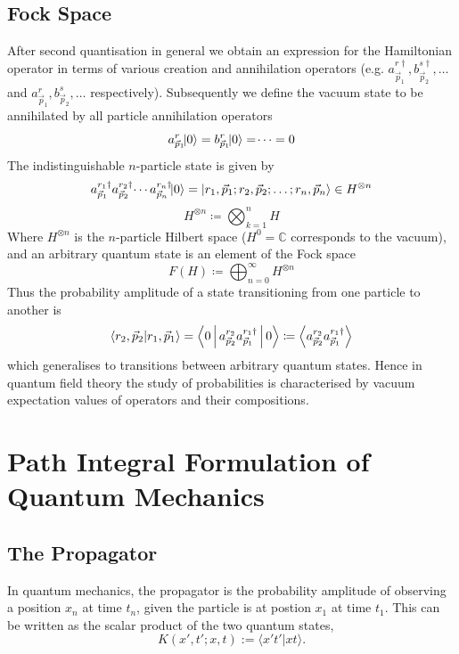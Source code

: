 \documentclass[11pt, a4paper]{article}
\theoremstyle{definition}
\theoremstyle{plain}
\begin{document}
\subsection{Fock Space}
After second quantisation in general we obtain an expression for the Hamiltonian operator
in terms of various creation and annihilation operators (e.g. $a^{r\dagger}_{\vec{p}_1},
b^{s\dagger}_{\vec{p}_2}, \dots$ and $a^{r}_{\vec{p}_1}, b^{s}_{\vec{p}_2}, \dots$ 
respectively). Subsequently we define the vacuum state to be annihilated by
all particle annihilation operators
\begin{equation}
  {a^{r}_{\vec{p}_1}}\!\!\ket{0} = b^{r}_{\vec{p}_1}\!\!\ket{0} = \dotsi = 0
\end{equation}
The indistinguishable $n$-particle state is given by 
\begin{equation}
  a^{r_1\dagger}_{\vec{p}_1}a^{r_2\dagger}_{\vec{p}_2}\dotsi
  a^{r_n\dagger}_{\vec{p}_n}\!\!\ket{0} =
  \ket{r_1, \vec{p}_1; r_2, \vec{p}_2; \dots; r_n, \vec{p}_n} \in H^{\otimes n}
\end{equation}
\begin{equation}
  H^{\otimes n} \coloneq \bigotimes_{k=1}^{n}{H}
\end{equation}
Where $H^{\otimes n}$ is the $n$-particle Hilbert space ($H^0 = \mathbb{C}$ 
corresponds to the vacuum),
and an arbitrary quantum state is an element of the Fock space
\begin{equation}
  F(H) \coloneq \bigoplus_{n=0}^{\infty}{H^{\otimes n}}
\end{equation}
Thus the probability amplitude of a state transitioning from one particle to 
another is
\begin{equation}
  \braket{r_2, \vec{p}_2|r_1, \vec{p}_1} =
  \Braket{0|a^{r_2}_{\vec{p}_2}a^{r_1\dagger}_{\vec{p}_1}|0} \coloneq 
  \Braket{a^{r_2}_{\vec{p}_2}a^{r_1\dagger}_{\vec{p}_1}}
\end{equation}
which generalises to transitions between arbitrary quantum states.
Hence in quantum field theory the study of probabilities is
characterised by vacuum expectation values of operators and their compositions.

\newpage

\section{Path Integral Formulation of Quantum Mechanics}

\subsection{The Propagator}
In quantum mechanics, the propagator is the probability 
amplitude of observing a position $x_n$ at time $t_n$, given 
the particle is at postion $x_1$ at time $t_1$. This can be 
written as the scalar product of the two quantum states,
\begin{equation} 
K(x',t';x,t) := \langle x't'|xt \rangle .
\label{propagator}
\end{equation}
\end{document}

